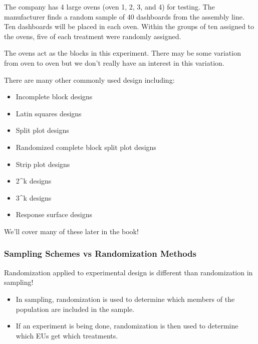 \documentclass[
]{book}
\providecommand{\tightlist}{%
  \setlength{\itemsep}{0pt}\setlength{\parskip}{0pt}}
\theoremstyle{definition}
\theoremstyle{definition}
\theoremstyle{definition}
\theoremstyle{remark}
\begin{document}
The company has 4 large ovens (oven 1, 2, 3, and 4) for testing. The manufacturer finds a random sample of 40 dashboards from the assembly line. Ten dashboards will be placed in each oven. Within the groups of ten assigned to the ovens, five of each treatment were randomly assigned.

The ovens act as the blocks in this experiment. There may be some variation from oven to oven but we don't really have an interest in this variation.

There are many other commonly used design including:

\begin{itemize}
\tightlist
\item
  Incomplete block designs
\item
  Latin squares designs\\
\item
  Split plot designs\\
\item
  Randomized complete block split plot designs\\
\item
  Strip plot designs\\
\item
  2\^{}k designs\\
\item
  3\^{}k designs\\
\item
  Response surface designs
\end{itemize}

We'll cover many of these later in the book!

\hypertarget{sampling-schemes-vs-randomization-methods}{%
\subsubsection{Sampling Schemes vs Randomization Methods}\label{sampling-schemes-vs-randomization-methods}}

Randomization applied to experimental design is different than randomization in sampling!

\begin{itemize}
\item
  In sampling, randomization is used to determine which members of the population are included in the sample.
\item
  If an experiment is being done, randomization is then used to determine which EUs get which treatments.
\end{itemize}
\end{document}
